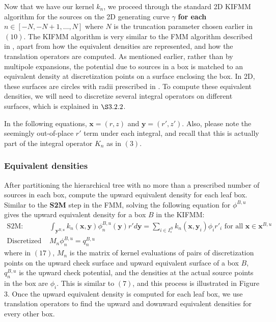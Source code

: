\documentclass[12pt,letterpaper]{article}
\begin{document}
Now that we have our kernel $k_n$, we proceed through the standard 2D KIFMM algorithm for the sources on the 2D generating curve $\gamma$ \textbf{for each} $n\in[-N,-N+1,\dots,N]$ where $N$ is the truncation parameter chosen earlier in $(10)$. The KIFMM algorithm is very similar to the FMM algorithm described in \cite{CGR}, apart from how the equivalent densities are represented, and how the translation operators are computed. As mentioned earlier, rather than by multipole expansions, the potential due to sources in a box is matched to an equivalent density at discretization points on a surface enclosing the box. In 2D, these surfaces are circles with radii prescribed in \cite{YBZ}. To compute these equivalent densities, we will need to discretize several integral operators on different surfaces, which is explained in $\S3.2.2$.

In the following equations, $\mathbf{x}=(r,z)$ and $\mathbf{y}=(r',z')$. Also, please note the seemingly out-of-place $r'$ term under each integral, and recall that this is actually part of the integral operator $K_n$ as in $(3)$.
\subsubsection{Equivalent densities}
After partitioning the hierarchical tree with no more than a prescribed number of sources in each box, compute the upward equivalent density for each leaf box. Similar to the \textbf{S2M} step in the FMM, solving the following equation for $\phi^{B,u}$ gives the upward equivalent density for a box $B$ in the KIFMM:
\begin{align}
\mbox{S2M: }&\int_{\mathbf{y}^{B,u}}{k_n(\mathbf{x},\mathbf{y})}\phi^{B,u}_n{(\mathbf{y})}r'd\mathbf{y}=\sum\limits_{i\in I_s^B} k_n(\mathbf{x},\mathbf{y}_i)\phi_ir'_i\mbox{ for all }\mathbf{x}\in\mathbf{x}^{B,u}\\
\mbox{Discretized S2M: }&M_n\phi^{B,u}_n=q_n^{B,u}
\end{align}
where in $(17)$, $M_n$ is the matrix of kernel evaluations of pairs of discretization points on the upward check surface and upward equivalent surface of a box $B$, $q_n^{B,u}$ is the upward check potential, and the densities at the actual source points in the box are $\phi_i$. This is similar to $(7)$, and this process is illustrated in Figure 3. Once the upward equivalent density is computed for each leaf box, we use translation operators to find the upward and downward equivalent densities for every other box.
\end{document}
